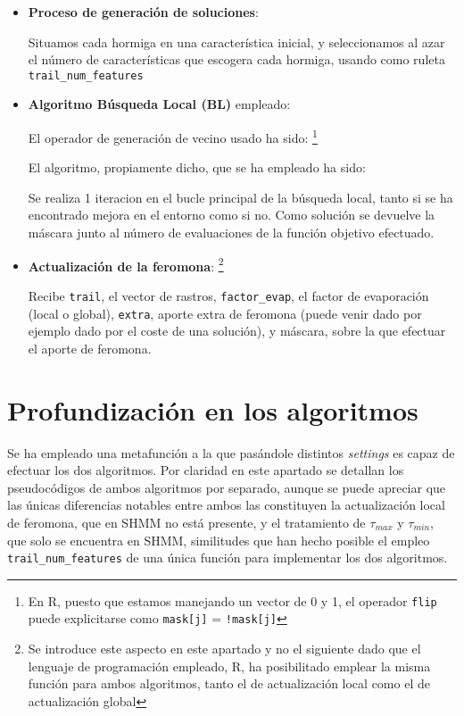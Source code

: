 \documentclass[a4paper,11pt]{article}
\begin{document}
\begin{itemize}
\begin{itemize}
    \small\texttt{}
    \normalsize  
  
  \item \textbf{Proceso de generación de soluciones}:
  
    \small\texttt{}
    \normalsize  
  
  Situamos cada hormiga en una característica inicial, y seleccionamos al azar el número de características que escogera
  cada hormiga, usando como ruleta \texttt{trail\_num\_features}

  \item \textbf{Algoritmo Búsqueda Local (BL)} empleado:
  
  El operador de generación de vecino usado ha sido:
  \footnote{En R, puesto que estamos manejando un vector de 0 y 1, el operador \texttt{flip} puede explicitarse como
  \texttt{mask[j]} = \texttt{!mask[j]}}
  
  \small\texttt{}
  \normalsize
  
  
  El algoritmo, propiamente dicho, que se ha empleado ha sido:\\
  
  \small\texttt{}
  \normalsize
  
  Se realiza 1 iteracion en el bucle principal de la búsqueda local, tanto si se ha encontrado mejora en el entorno como
  si no. Como solución se devuelve la máscara junto al número de evaluaciones de la función objetivo efectuado.

  \item \textbf{Actualización de la feromona}:
  \footnote{Se introduce este aspecto en este apartado y no el siguiente dado que el lenguaje de programación empleado,
  R, ha posibilitado emplear la misma función para ambos algoritmos, tanto el de actualización local como el de actualización
  global}
  
  \small\texttt{}
  
  Recibe \texttt{trail}, el vector de rastros, \texttt{factor\_evap}, el factor de evaporación (local o global), 
  \texttt{extra}, aporte extra de feromona (puede venir dado por ejemplo dado por el coste de una solución), y máscara,
  sobre la que efectuar el aporte de feromona.
  \normalsize
  
\end{itemize}

\end{itemize}
\section{Profundización en los algoritmos}
Se ha empleado una metafunción a la que pasándole distintos \textit{settings} es capaz de efectuar los dos algoritmos.
Por claridad en este apartado se detallan los pseudocódigos de ambos algoritmos por separado, aunque se puede apreciar que
las únicas diferencias notables entre ambos las constituyen la actualización local de feromona, que en SHMM no está presente,
y el tratamiento de $\tau_{max}$ y $\tau_{min}$, que solo se encuentra en SHMM, similitudes que han hecho posible el empleo \texttt{trail\_num\_features}
de una única función para implementar los dos algoritmos.
\end{document}
